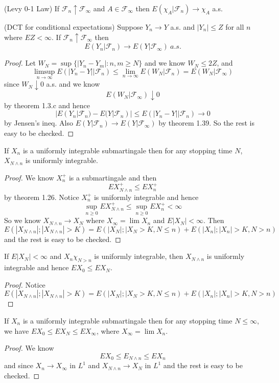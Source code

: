 \documentclass[lang=en, color=blue, ]{elegantbook}
\newcommand{\F}{\mathcal{F}}
\begin{document}
\begin{theorem}
    (Levy 0-1 Law) If $\F_n\uparrow \F_{\infty}$ and $A\in\F_{\infty}$ then $E(\chi_A|\F_n) \to \chi_A$ a.s. 
\end{theorem}

\begin{theorem}
    (DCT for conditional expectations) Suppose $Y_n\to Y$ a.s. and $|Y_n| \leq Z$ for all $n$ where $EZ<\infty$. If $\F_n \uparrow\F_{\infty}$ then
    \[E(Y_n|\F_n) \to E(Y|\F_{\infty})\ a.s.\]
\end{theorem}
\begin{proof}
    Let $W_N = \sup\{|Y_n-Y_m|:n,m\geq N\}$ and we know $W_N \leq 2Z$, and
    \[
    \limsup_{n\to \infty}E(|Y_n-Y||\F_n) \leq \lim_{n\to\infty} E(W_N|\F_n) = E(W_N|\F_{\infty})
    \]
    since $W_N \downarrow 0$ a.s. and we know
    \[
    E(W_N|\F_{\infty}) \downarrow 0
    \]
    by theorem 1.3.c and hence
    \[
    |E(Y_n|\F_n) - E(Y|\F_n)| \leq E(|Y_n-Y||\F_n) \to 0
    \]
    by Jensen's ineq. Also $E(Y|\F_n) \to E(Y|\F_{\infty})$ by theorem 1.39. So the rest is easy to be checked.
\end{proof}

\begin{theorem}
    If $X_n$ is a uniformly integrable submartingale then for any stopping time $N$, $X_{N\wedge n}$ is uniformly integrable.
\end{theorem}
\begin{proof}
    We know $X_n^+$ is a submartingale and then
    \[EX_{N\wedge n}^+ \leq EX_n^+\]
    by theorem 1.26. Notice $X_n^+$ is uniformly integrable and hence
    \[\sup_{n\geq 0} EX_{N\wedge n}^+ \leq \sup_{n\geq 0}EX_n^+ < \infty\]
    So we know $X_{N\wedge n} \to X_N$ where $X_{\infty} = \lim X_n$ and $E|X_N| < \infty$. Then
    \[
    E(|X_{N\wedge n}|;|X_{N\wedge n}| > K) = E(|X_N|;|X_N>K, N \leq n) + E(|X_n|;|X_n|>K,N>n)
    \]
    and the rest is easy to be checked.
\end{proof}

\begin{theorem}
    If $E|X_N| < \infty$ and $X_n\chi_{N>n}$ is uniformly integrable, then $X_{N\wedge n}$ is uniformly integrable and hence $EX_0 \leq EX_N$.
\end{theorem}
\begin{proof}
    Notice
     \[
    E(|X_{N\wedge n}|;|X_{N\wedge n}| > K) = E(|X_N|;|X_N>K, N \leq n) + E(|X_n|;|X_n|>K,N>n)
    \]
\end{proof}

\begin{theorem}
    If $X_n$ is a uniformly integrable submartingale then for any stopping time $N\leq\infty$, we have $EX_0 \leq EX_N \leq EX_{\infty}$, where $X_{\infty} = \lim X_n$.
\end{theorem}
\begin{proof}
    We know
    \[EX_0 \leq E_{N\wedge n} \leq EX_n\]
    and since $X_n\to X_{\infty}$ in $L^1$ and $X_{N\wedge n} \to X_{N}$ in $L^1$ and the rest is easy to be checked.
\end{proof}
\end{document}
